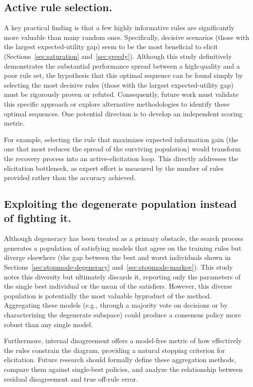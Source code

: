 \subsection{Active rule selection.} A key practical finding is that a few highly informative rules are significantly more valuable than many random ones. Specifically, decisive scenarios (those with the largest expected-utility gap) seem to be the most beneficial to elicit (Sections~\ref{sec:saturation} and~\ref{sec:greedy}). Although this study definitively demonstrates the substantial performance spread between a high-quality and a poor rule set, the hypothesis that this optimal sequence can be found simply by selecting the most decisive rules (those with the largest expected-utility gap) must be rigorously proven or refuted. Consequently, future work must validate this specific approach or explore alternative methodologies to identify these optimal sequences. One potential direction is to develop an independent scoring metric. 

For example, selecting the rule that maximizes expected information gain (the one that most reduces the spread of the surviving population) would transform the recovery process into an active-elicitation loop. This directly addresses the elicitation bottleneck, as expert effort is measured by the number of rules provided rather than the accuracy achieved.

\subsection{Exploiting the degenerate population instead of fighting it.} Although degeneracy has been treated as a primary obstacle, the search process generates a population of satisfying models that agree on the training rules but diverge elsewhere (the gap between the best and worst individuals shown in Sections~\ref{sec:stopmode-degeneracy} and~\ref{sec:stopmode-markov}). This study notes this diversity but ultimately discards it, reporting only the parameters of the single best individual or the mean of the satisfiers. However, this diverse population is potentially the most valuable byproduct of the method. Aggregating these models (e.g., through a majority vote on decisions or by characterizing the degenerate subspace) could produce a consensus policy more robust than any single model. 

Furthermore, internal disagreement offers a model-free metric of how effectively the rules constrain the diagram, providing a natural stopping criterion for elicitation. Future research should formally define these aggregation methods, compare them against single-best policies, and analyze the relationship between residual disagreement and true off-rule error.

